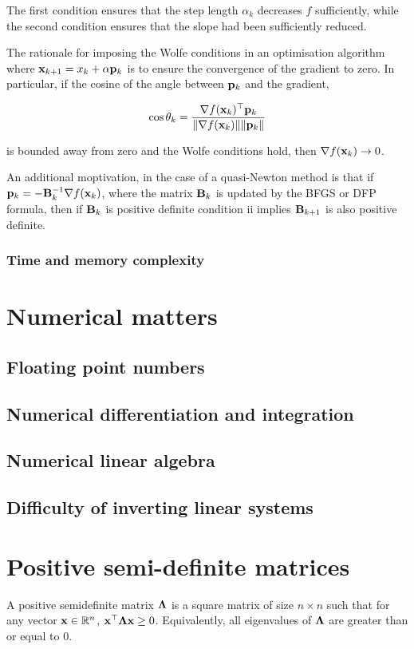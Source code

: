 \documentclass{article}[12pt]
\begin{document}
The first condition ensures that the step length $\alpha_k$ decreases $f$ sufficiently, while the second condition
ensures that the slope had been sufficiently reduced.

The rationale for imposing the Wolfe conditions in an optimisation algorithm where
${\bf x}_{k+1} = x_k + \alpha {\bf p}_k$ is to ensure the convergence of the gradient to zero. In particular, if the
cosine of the angle between ${\bf p}_k$ and the gradient,

$$
\cos \theta_k = \frac{\nabla f({\bf x}_k)^\top {\bf p}_k}{\|\nabla f({\bf x}_k)\| \|{\bf p}_k\|}
$$

is bounded away from zero and the Wolfe conditions hold, then $\nabla f({\bf x}_k) \to 0$.

An additional moptivation, in the case of a quasi-Newton method is that if ${\bf p}_k = - {\bf B}_k^{-1} \nabla f({\bf x}_k)$,
where the matrix ${\bf B}_k$ is updated by the BFGS or DFP formula, then if ${\bf B}_k$ is positive definite condition ii
implies ${\bf B}_{k+1}$ is also positive definite.

\subsubsection{Time and memory complexity}

\section{Numerical matters}

\subsection{Floating point numbers}
\subsection{Numerical differentiation and integration}
\subsection{Numerical linear algebra}
\subsection{Difficulty of inverting linear systems}

\section{Positive semi-definite matrices}
A positive semidefinite matrix ${\boldsymbol \Lambda}$ is a square matrix of size $n \times n$ such that for any vector
${\bf x} \in {\mathbb{R}}^n$, ${\bf x}^\top {\boldsymbol\Lambda} {\bf x} \geq 0$. Equivalently, all eigenvalues of ${\boldsymbol \Lambda}$ are greater than or 
equal to 0.
\end{document}
